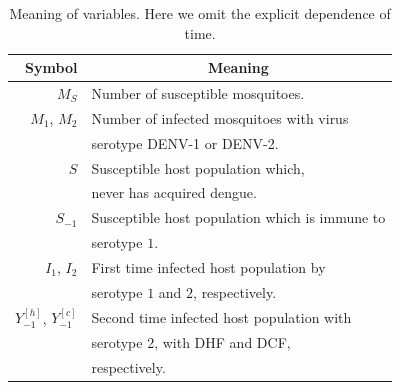 \begin{table}[h!]
	\begin{center}
		\begin{tabular}{rl}
			\toprule
			Symbol		&	\multicolumn{1}{c}{Meaning}
			\\
			\midrule
			$M_S$
				& Number of susceptible mosquitoes.
			\\
			$M_1$, $M_2$
				&
				 Number of infected mosquitoes with virus
				\\
				& 
				serotype \ac{DENV-1} or \ac{DENV-2}.
			\\
			$S$
				&
				Susceptible host population which, 
				\\
				& never has acquired dengue.
			\\
			$S_{-1}$
			&
				Susceptible host population 
				which is immune to
			\\
			&
				serotype $1$.
			\\
			$I_1$, $I_2$
			&
				First time infected host population by 
			\\
				& serotype $1$ and $2$, respectively.
			\\
				$Y_{-1}^{[h]}$,
				$Y_{-1}^{[c]}$
				&
				Second time infected host population with 
				\\
				&
				serotype 2, with \ac{DHF} and \ac{DCF}, 
                \\
                &
                respectively.
			\\
		\bottomrule
		\end{tabular}
	\end{center}
	\caption{
		Meaning of variables. 
		Here we omit the explicit dependence of
		time.
	}\label{tbl:variable_description}
\end{table}
